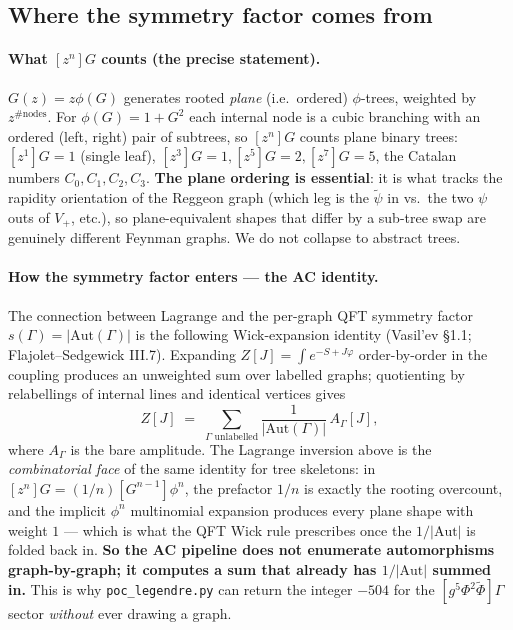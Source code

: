 \documentclass[11pt,a4paper]{article}
\begin{document}
\subsection{Where the symmetry factor comes from}

\paragraph{What $[z^n]G$ counts (the precise statement).}
$G(z)=z\phi(G)$ generates rooted \emph{plane} (i.e.\ ordered) $\phi$-trees,
weighted by $z^{\#\text{nodes}}$. For $\phi(G)=1+G^2$ each internal node is a
cubic branching with an ordered (left, right) pair of subtrees, so $[z^n]G$
counts plane binary trees: $[z^1]G=1$ (single leaf), $[z^3]G=1, [z^5]G=2,
[z^7]G=5$, the Catalan numbers $C_0,C_1,C_2,C_3$. \textbf{The plane
ordering is essential}: it is what tracks the rapidity orientation of the
Reggeon graph (which leg is the $\tilde\psi$ in vs.\ the two $\psi$ outs of
$V_+$, etc.), so plane-equivalent shapes that differ by a sub-tree swap are
genuinely different Feynman graphs. We do not collapse to abstract trees.

\paragraph{How the symmetry factor enters --- the AC identity.}
The connection between Lagrange and the per-graph QFT symmetry factor
$s(\Gamma)=|\mathrm{Aut}(\Gamma)|$ is the following Wick-expansion identity
(Vasil'ev \S1.1; Flajolet--Sedgewick III.7). Expanding $Z[J]=\int e^{-S+J\varphi}$
order-by-order in the coupling produces an unweighted sum over labelled graphs;
quotienting by relabellings of internal lines and identical vertices gives
\[
Z[J] \;=\; \sum_{\Gamma\text{ unlabelled}} \frac{1}{|\mathrm{Aut}(\Gamma)|}\,A_\Gamma[J],
\]
where $A_\Gamma$ is the bare amplitude. The Lagrange inversion above is the
\emph{combinatorial face} of the same identity for tree skeletons: in
$[z^n]G=(1/n)[G^{n-1}]\phi^n$, the prefactor $1/n$ is exactly the rooting
overcount, and the implicit $\phi^n$ multinomial expansion produces every
plane shape with weight $1$ --- which is what the QFT Wick rule prescribes
once the $1/|\mathrm{Aut}|$ is folded back in.
\textbf{So the AC pipeline does not enumerate automorphisms graph-by-graph;
it computes a sum that already has $1/|\mathrm{Aut}|$ summed in.} This is why
\texttt{poc\_legendre.py} can return the integer $-504$ for the
$[g^5\Phi^2\tilde\Phi]\Gamma$ sector \emph{without} ever drawing a graph.
\end{document}

